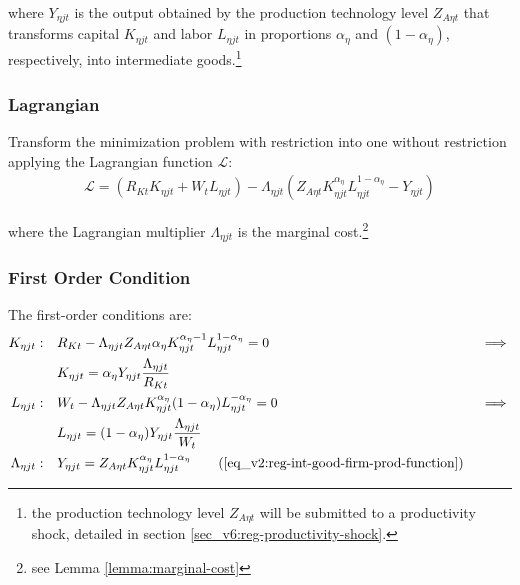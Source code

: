 \documentclass[../thesis.tex]{subfiles}
\begin{document}
where $Y_{\eta jt}$ is the output obtained by the production technology level $Z_{A\eta t}$ that transforms capital $K_{\eta jt}$ and labor $L_{\eta jt}$ in proportions ${\alpha_{\eta}}$ and $(1-{\alpha_{\eta}})$, respectively, into intermediate goods.\footnote{the production technology level $Z_{A\eta t}$ will be submitted to a productivity shock, detailed in section \ref{sec_v6:reg-productivity-shock}.}

\subsubsection*{Lagrangian}

Transform the minimization problem with restriction into one without restriction applying the Lagrangian function $\mathcal{L}$:
\begin{align}
	\label{eq_v2:reg-int-good-firm-lagrangian}
	\mathcal{L} = (R_{Kt} K_{\eta jt} + W_t L_{\eta jt}) - \Lambda_{\eta jt} (Z_{A\eta t} K_{\eta jt}^{\alpha_{\eta}} L_{\eta jt}^{1-{\alpha_{\eta}}} - Y_{\eta jt})
\end{align}

where the Lagrangian multiplier $\Lambda_{\eta jt}$ is the marginal cost.\footnote{see Lemma \ref{lemma:marginal-cost}}

\subsubsection*{First Order Condition}

The first-order conditions are:
\begin{alignat}{2}
	K_{\eta jt}: \quad & R_{Kt} - \Lambda_{\eta jt} Z_{A\eta t} {\alpha_{\eta}} K_{\eta jt}^{{\alpha_{\eta}}-1} L_{\eta jt}^{1-{\alpha_{\eta}}} = 0 &&\implies \nonumber \\
	& K_{\eta jt} = {\alpha_{\eta}} Y_{\eta jt} \frac{\Lambda_{\eta jt}}{R_{Kt}} \label{eq_v2:reg-int-good-firm-FOC-Kt} \\
	L_{\eta jt}: \quad & W_t - \Lambda_{\eta jt} Z_{A\eta t} K_{\eta jt}^{\alpha_{\eta}} (1-{\alpha_{\eta}}) L_{\eta jt}^{-{\alpha_{\eta}}} = 0 \quad &&\implies \nonumber \\ 
	& L_{\eta jt} = (1-{\alpha_{\eta}}) Y_{\eta jt} \frac{\Lambda_{\eta jt}}{W_t} \label{eq_v2:reg-int-good-firm-FOC-Lt-0} \\
	\Lambda_{\eta jt}: \quad & Y_{\eta jt} = Z_{A\eta t} K_{\eta jt}^{\alpha_{\eta}} L_{\eta jt}^{1-{\alpha_{\eta}}} \tag{\ref{eq_v2:reg-int-good-firm-prod-function}}
\end{alignat}
\end{document}

